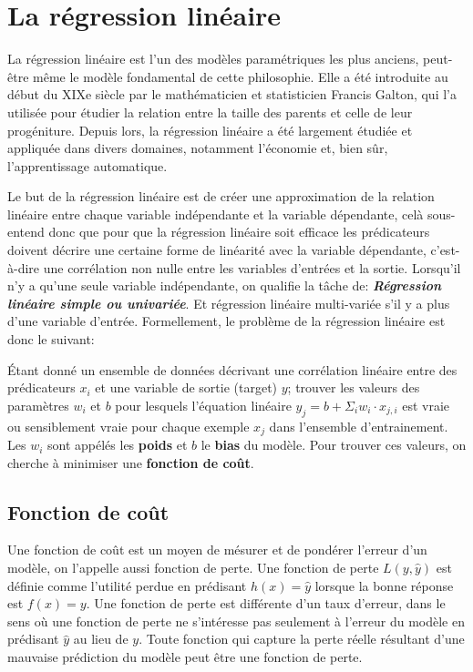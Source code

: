 \section{La régression linéaire}
\label{chap4.section5}
La régression linéaire est l’un des modèles paramétriques les plus anciens, peut-être même le modèle fondamental de cette philosophie. Elle a été introduite au début du XIXe siècle par le mathématicien et statisticien Francis Galton, qui l'a utilisée pour étudier la relation entre la taille des parents et celle de leur progéniture. Depuis lors, la régression linéaire a été largement étudiée et appliquée dans divers domaines, notamment l’économie et, bien sûr, l’apprentissage automatique.

Le but de la régression linéaire est de créer une approximation de la relation linéaire entre chaque variable indépendante et la variable dépendante, celà sous-entend donc que pour que la régression linéaire soit efficace les prédicateurs doivent décrire une certaine forme de linéarité avec la variable dépendante, c'est-à-dire une corrélation non nulle entre les variables d'entrées et la sortie. Lorsqu’il n’y a qu’une seule variable indépendante, on qualifie la tâche de: \textbf{\textit{Régression linéaire simple ou univariée}}. Et régression linéaire multi-variée s'il y a plus d'une variable d'entrée. Formellement, le problème de la régression linéaire est donc le suivant:

Étant donné un ensemble de données décrivant une corrélation linéaire entre des prédicateurs \(x_i\) et une variable de sortie (target) \(y\); trouver les valeurs des paramètres \(w_i\) et \(b\) pour lesquels l'équation linéaire \(y_j = b + \Sigma_i w_i \cdot x_{j,i}\) est vraie ou sensiblement vraie pour chaque exemple \(x_j\) dans l'ensemble d'entrainement. Les \(w_i\) sont appélés les \textbf{poids} et \(b\) le \textbf{bias} du modèle. Pour trouver ces valeurs, on cherche à minimiser une \textbf{fonction de coût}.

\subsection{Fonction de coût}
\label{chap4.sec5.sub1}
Une fonction de coût est un moyen de mésurer et de pondérer l'erreur d'un modèle, on l'appelle aussi fonction de perte. Une fonction de perte \(L(y, \hat{y})\) est définie comme l'utilité perdue en prédisant \(h(x)= \hat{y}\) lorsque la bonne réponse est \(f(x) = y\). Une fonction de perte est différente d’un taux d’erreur, dans le sens où une fonction de perte ne s’intéresse pas seulement à l’erreur du modèle en prédisant \(\hat{y}\) au lieu de \(y\). Toute fonction qui capture la perte réelle résultant d'une mauvaise prédiction du modèle peut être une fonction de perte.


